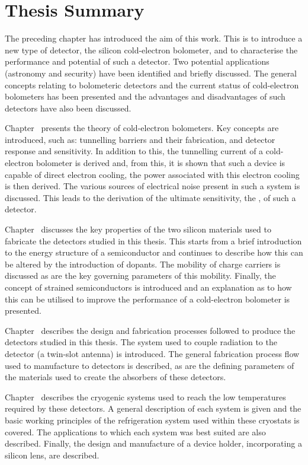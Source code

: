 \section{Thesis Summary}
The preceding chapter has introduced the aim of this work. This is to introduce a new type of detector, the silicon cold-electron bolometer, and to characterise the performance and potential of such a detector. Two potential applications (astronomy and security) have been identified and briefly discussed. The general concepts relating to bolometeric detectors and the current status of cold-electron bolometers has been presented and the advantages and disadvantages of such detectors have also been discussed. 
\par 
Chapter~ presents the theory of cold-electron bolometers. Key concepts are introduced, such as: tunnelling barriers and their fabrication, and detector response and sensitivity. In addition to this, the tunnelling current of a cold-electron bolometer is derived and, from this, it is shown that such a device is capable of direct electron cooling, the power associated with this electron cooling is then derived. The various sources of electrical noise present in such a system is discussed. This leads to the derivation of the ultimate sensitivity, the , of such a detector.
\par 
Chapter~ discusses the key properties of the two silicon materials used to fabricate the detectors studied in this thesis. This starts from a brief introduction to the energy structure of a semiconductor and continues to describe how this can be altered by the introduction of dopants. The mobility of charge carriers is discussed as are the key governing parameters of this mobility. Finally, the concept of strained semiconductors is introduced and an explanation as to how this can be utilised to improve the performance of a cold-electron bolometer is presented.
\par 
Chapter~ describes the design and fabrication processes followed to produce the detectors studied in this thesis. The system used to couple radiation to the detector (a twin-slot antenna) is introduced. The general fabrication process flow used to manufacture to detectors is described, as are the defining parameters of the materials used to create the absorbers of these detectors.
\par 
Chapter~ describes the cryogenic systems used to reach the low temperatures required by these detectors. A general description of each system is given and the basic working principles of the refrigeration system used within these cryostats is covered. The applications to which each system was best suited are also described. Finally, the design and manufacture of a device holder, incorporating a silicon lens, are described.
